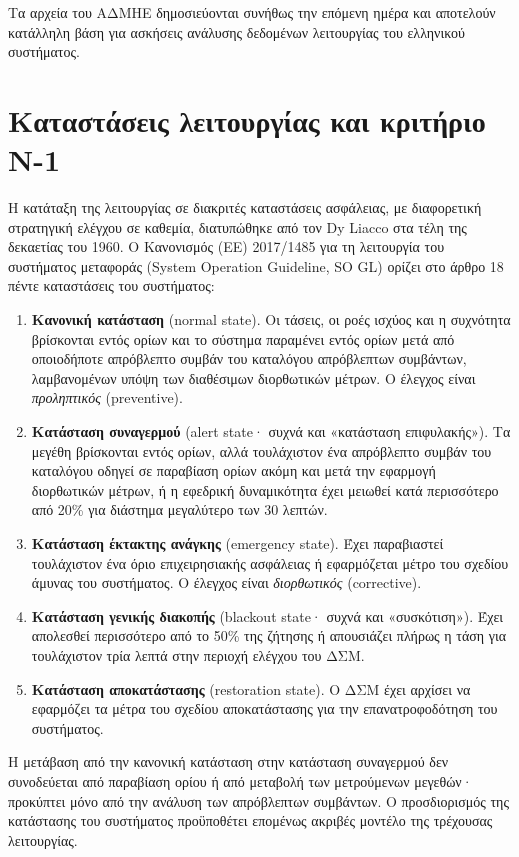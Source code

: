 Τα αρχεία του ΑΔΜΗΕ δημοσιεύονται συνήθως την επόμενη ημέρα και αποτελούν κατάλληλη βάση για
ασκήσεις ανάλυσης δεδομένων λειτουργίας του ελληνικού συστήματος.

\section{Καταστάσεις λειτουργίας και κριτήριο N-1}
\label{sec:states}

Η κατάταξη της λειτουργίας σε διακριτές καταστάσεις ασφάλειας, με διαφορετική στρατηγική
ελέγχου σε καθεμία, διατυπώθηκε από τον Dy Liacco στα τέλη της δεκαετίας του 1960. Ο
Κανονισμός (ΕΕ) 2017/1485 για τη λειτουργία του συστήματος μεταφοράς (System Operation
Guideline, SO GL) ορίζει στο άρθρο 18 πέντε καταστάσεις του συστήματος:

\begin{enumerate}
\item \textbf{Κανονική κατάσταση} (normal state). Οι τάσεις, οι ροές ισχύος και η συχνότητα
      βρίσκονται εντός ορίων και το σύστημα παραμένει εντός ορίων μετά από οποιοδήποτε
      απρόβλεπτο συμβάν του καταλόγου απρόβλεπτων συμβάντων, λαμβανομένων υπόψη των
      διαθέσιμων διορθωτικών μέτρων. Ο έλεγχος είναι \emph{προληπτικός} (preventive).
\item \textbf{Κατάσταση συναγερμού} (alert state· συχνά και «κατάσταση επιφυλακής»). Τα
      μεγέθη βρίσκονται εντός ορίων, αλλά τουλάχιστον ένα απρόβλεπτο συμβάν του καταλόγου
      οδηγεί σε παραβίαση ορίων ακόμη και μετά την εφαρμογή διορθωτικών μέτρων, ή η
      εφεδρική δυναμικότητα έχει μειωθεί κατά περισσότερο από 20\% για διάστημα
      μεγαλύτερο των 30 λεπτών.
\item \textbf{Κατάσταση έκτακτης ανάγκης} (emergency state). Έχει παραβιαστεί τουλάχιστον
      ένα όριο επιχειρησιακής ασφάλειας ή εφαρμόζεται μέτρο του σχεδίου άμυνας του
      συστήματος. Ο έλεγχος είναι \emph{διορθωτικός} (corrective).
\item \textbf{Κατάσταση γενικής διακοπής} (blackout state· συχνά και «συσκότιση»). Έχει
      απολεσθεί περισσότερο από το 50\% της ζήτησης ή απουσιάζει πλήρως η τάση για
      τουλάχιστον τρία λεπτά στην περιοχή ελέγχου του ΔΣΜ.
\item \textbf{Κατάσταση αποκατάστασης} (restoration state). Ο ΔΣΜ έχει αρχίσει να
      εφαρμόζει τα μέτρα του σχεδίου αποκατάστασης για την επανατροφοδότηση του
      συστήματος.
\end{enumerate}

Η μετάβαση από την κανονική κατάσταση στην κατάσταση συναγερμού δεν συνοδεύεται από
παραβίαση ορίου ή από μεταβολή των μετρούμενων μεγεθών· προκύπτει μόνο από την ανάλυση
των απρόβλεπτων συμβάντων. Ο προσδιορισμός της κατάστασης του συστήματος προϋποθέτει
επομένως ακριβές μοντέλο της τρέχουσας λειτουργίας.

